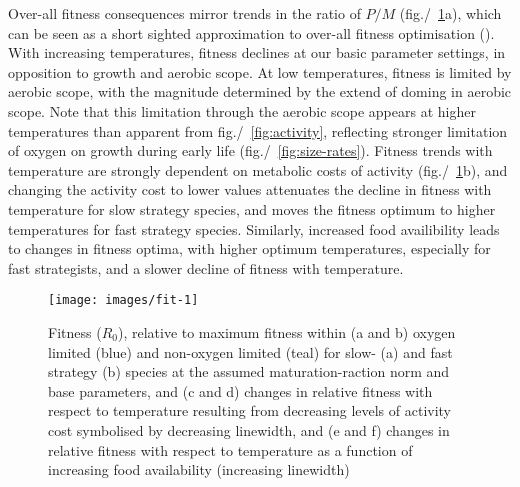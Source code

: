 \documentclass[11pt]{article}\usepackage[]{graphicx}\usepackage[]{color}
\makeatletter
\def\maxwidth{ %
  \ifdim\Gin@nat@width>\linewidth
    \linewidth
  \else
    \Gin@nat@width
  \fi
}
\makeatother
\begin{document}
Over-all fitness consequences mirror trends in the ratio of $P/M$ (fig./~\ref{fig:fit}a), which can be seen as a short sighted approximation to over-all fitness optimisation (\cite{sainmont_effective_2015}). With increasing temperatures, fitness declines at our basic parameter settings, in opposition to growth and aerobic scope. At low temperatures, fitness is limited by aerobic scope, with the magnitude determined by the extend of doming in aerobic scope. Note that this limitation through the aerobic scope appears at higher temperatures than apparent from fig./~\ref{fig:activity}, reflecting stronger limitation of oxygen on growth during early life (fig./~\ref{fig:size-rates}). Fitness trends with temperature are strongly dependent on metabolic costs of activity (fig./~\ref{fig:fit}b), and changing the activity cost to lower values attenuates the decline in fitness with temperature for slow strategy species, and moves the fitness optimum to higher temperatures for fast strategy species. Similarly, increased food availibility leads to changes in fitness optima, with higher optimum temperatures, especially for fast strategists, and a slower decline of fitness with temperature.



\begin{figure}

{\centering \texttt{[image: images/fit-1]} 

}

\caption[Fitness ($R_0$), relative to maximum fitness within (a and b) oxygen limited (blue) and non-oxygen limited (teal) for slow- (a) and fast strategy (b) species at the assumed maturation-raction norm and base parameters, and (c and d) changes in relative fitness with respect to temperature resulting from decreasing levels of activity cost symbolised by decreasing linewidth, and (e and f) changes in relative fitness with respect to temperature as a function of increasing food availability (increasing linewidth)]{Fitness ($R_0$), relative to maximum fitness within (a and b) oxygen limited (blue) and non-oxygen limited (teal) for slow- (a) and fast strategy (b) species at the assumed maturation-raction norm and base parameters, and (c and d) changes in relative fitness with respect to temperature resulting from decreasing levels of activity cost symbolised by decreasing linewidth, and (e and f) changes in relative fitness with respect to temperature as a function of increasing food availability (increasing linewidth)}\label{fig:fit}
\end{figure}
\end{document}
